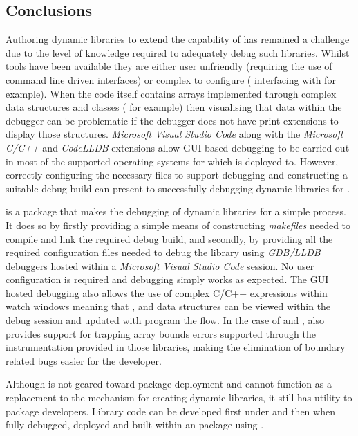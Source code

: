 \hypertarget{Conclusions}{%
\subsection{Conclusions}
\label{Conclusions}}

Authoring dynamic libraries to extend the capability of  has remained a challenge due to the level of knowledge required to adequately debug such libraries.
Whilst tools have been available they are either user unfriendly (requiring the use of command line driven interfaces) or complex to configure ( interfacing with  
for example). When the code itself contains arrays implemented through complex data structures and classes ( for example) then visualising that data within the 
debugger can be problematic if the debugger does not have print extensions to display those structures. \emph{Microsoft Visual Studio Code} along with the \emph{Microsoft C/C++}
and \emph{CodeLLDB} extensions allow GUI based debugging to be carried out in most of the supported operating systems for which  is deployed to. However, correctly 
configuring the necessary files to support debugging and constructing a suitable debug build can present to successfully debugging dynamic libraries for .

 is a package that makes the debugging of dynamic libraries for  a simple process. It does so by firstly providing a simple means of constructing 
\emph{makefiles} needed to compile and link the required debug build, and secondly, by providing all the required configuration files needed to debug the library using \emph{GDB/LLDB} debuggers 
hosted within a \emph{Microsoft Visual Studio Code} session. No user configuration is required and debugging simply works as expected. The GUI hosted debugging also allows 
the use of complex C/C++ expressions within watch windows meaning that ,  and  data structures can be viewed within the debug session and 
updated with program the flow. In the case of  and ,  also provides support for trapping array bounds errors supported through the instrumentation
provided in those libraries, making the elimination of boundary related bugs easier for the developer. 

Although  is not geared toward package deployment and cannot function as a replacement to the  mechanism for creating dynamic libraries, it still
has utility to package developers. Library code can be developed first under  and then when fully debugged, deployed and built within an  package using . 



\address{%
Paavo Jumppanen\\
CSIRO Marine and Atmospheric Research\\%
Castray Esplanade,\\Battery Point TAS 7004,\\Australia\\
%
\url{https://www.csiro.au}%
\\\href{mailto:paavo.jumppanen@csiro.au}{\nolinkurl{paavo.jumppanen@csiro.au}}
}

